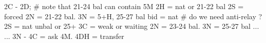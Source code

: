 2C - 2D;
# note that 21-24 bal can contain 5M
2H = nat or 21-22 bal
    2S = forced
        2N = 21-22 bal. 3N = 5+H, 25-27 bal
        bid = nat
    # do we need anti-relay ?
2S = nat unbal or 25+
    3C = weak or waiting
2N = 23-24 bal. 3N = 25-27 bal ...
    ... 3N - 4C = ask 4M. 4DH = transfer
